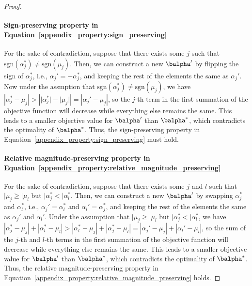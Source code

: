 \begin{proof}
    \paragraph{Sign-preserving property in Equation~\eqref{appendix_property:sign_preserving}} 
    For the sake of contradiction, suppose that there exists some $j$ such that $\text{sgn}(\alpha_j^*) \neq \text{sgn}(\mu_j)$.
    Then, we can construct a new $\balpha'$ by flipping the sign of $\alpha_j^*$, i.e., $\alpha_j' = -\alpha_j^*$, and keeping the rest of the elements the same as $\alpha_j'$.
    Now under the assmption that $\text{sgn}(\alpha_j^*) \neq \text{sgn}(\mu_j)$, we have $\left\lvert{\alpha_j^* - \mu_j}\right\rvert > \left\lvert{\lvert{\alpha_j^*}\rvert - \lvert{\mu_j}\rvert}\right\rvert = \left\lvert{\alpha_j' - \mu_j}\right\rvert$, so the $j$-th term in the first summation of the objective function will decrease while everything else remains the same.
    This leads to a smaller objective value for $\balpha'$ than $\balpha^*$, which contradicts the optimality of $\balpha^*$.
    Thus, the sign-preserving property in Equation~\eqref{appendix_property:sign_preserving} must hold.
    
    \paragraph{Relative magnitude-preserving property in Equation~\eqref{appendix_property:relative_magnitude_preserving}} 
    For the sake of contradiction, suppose that there exists some $j$ and $l$ such that $\vert{\mu_j} \geq \vert{\mu_l}$ but $\vert{\alpha_j^*} < \vert{\alpha_l^*}$.
    Then, we can construct a new $\balpha'$ by swapping $\alpha_j^*$ and $\alpha_l^*$, i.e., $\alpha_j' = \alpha_l^*$ and $\alpha_l' = \alpha_j^*$, and keeping the rest of the elements the same as $\alpha_j'$ and $\alpha_l'$.
    Under the assumption that $\vert{\mu_j} \geq \vert{\mu_l}$ but $\vert{\alpha_j^*} < \vert{\alpha_l^*}$, we have $\left\lvert{\alpha_j^* - \mu_j}\right\rvert + \left\lvert{\alpha_l^* - \mu_l}\right\rvert > \left\lvert{\alpha_l^* - \mu_j}\right\rvert + \left\lvert{\alpha_j^* - \mu_l}\right\rvert =
    \left\lvert{\alpha_j' - \mu_j}\right\rvert + \left\lvert{\alpha_l' - \mu_l}\right\rvert$, so the sum of the $j$-th and $l$-th terms in the first summation of the objective function will decrease while everything else remains the same.
    This leads to a smaller objective value for $\balpha'$ than $\balpha^*$, which contradicts the optimality of $\balpha^*$.
    Thus, the relative magnitude-preserving property in Equation~\eqref{appendix_property:relative_magnitude_preserving} holds.
    

\end{proof}
